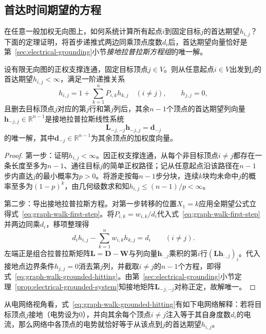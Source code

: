 \subsection{首达时间期望的方程}
\label{sec:graph-walk-hitting-equation}

在任意一般加权无向图上，如何系统计算所有起点$i$到固定目标$j$的首达期望$h_{i,j}$？下面的定理证明，将首步递推式两边同乘顶点度数$d_i$后，首达期望向量恰好是第~\ref{sec:electrical-grounding}小节\emph{接地拉普拉斯方程组}的唯一解。

\begin{theorem}[首达期望的接地拉普拉斯方程]
\label{prop:graph-walk-hitting-system}
设有限无向图的正权支撑连通，固定目标顶点$j\in V$。则从任意起点$i\in V$出发到$j$的首达期望$h_{i,j}<\infty$，满足一阶递推关系
\begin{equation}
h_{i,j}=1+\sum_{k=1}^n P_{i,k}h_{k,j}\quad(i\ne j),\qquad h_{j,j}=0,
\label{eq:graph-walk-first-step}
\end{equation}
且删去目标顶点$j$对应的第$j$行和第$j$列后，其余$n-1$个顶点的首达期望列向量$\bm h_{-j,j}\in\mathbb R^{n-1}$是接地拉普拉斯线性系统
\begin{equation}
\bm{L}_{-j,-j}\bm{h}_{-j,j}=\bm{d}_{-j}
\label{eq:graph-walk-grounded-hitting}
\end{equation}
的唯一解，其中$\bm d_{-j}\in\mathbb R^{n-1}$为其余顶点的加权度向量。
\end{theorem}

\begin{proof}
第一步：证明$h_{i,j}<\infty$。因正权支撑连通，从每个非目标顶点$i\neq j$都存在一条长度至多为$n-1$、通往目标$j$的简单正权路径；记从任意起点沿该路径在$n-1$步内直达$j$的最小概率为$p>0$。将游走按每$n-1$步分块，连续$k$块均未命中$j$的概率至多为$(1-p)^k$，由几何级数求和知$h_{i,j}\leq(n-1)/p<\infty$。

第二步：导出接地拉普拉斯方程。对第一步转移的位置$X_1=k$应用全期望公式立得式~\eqref{eq:graph-walk-first-step}。将$P_{i,k}=w_{i,k}/d_i$代入式~\eqref{eq:graph-walk-first-step}并两边同乘$d_i$，移项整理得
\[
d_i h_{i,j}-\sum_{k=1}^n w_{i,k}h_{k,j}=d_i\qquad(i\ne j).
\]
左端正是组合拉普拉斯矩阵$\bm L=\bm D-\bm W$与列向量$\bm h_{:,j}$乘积的第$i$行$(\bm L\bm h_{:,j})_i$。代入接地点边界条件$h_{j,j}=0$消去第$j$列，并截取$i\neq j$的$n-1$个方程，即得式~\eqref{eq:graph-walk-grounded-hitting}。由第~\ref{sec:electrical-grounding}小节定理~\ref{prop:electrical-grounded-system}知接地矩阵$\bm L_{-j,-j}$对称正定，故解唯一。
\end{proof}

从电网络视角看，式~\eqref{eq:graph-walk-grounded-hitting}有如下电网络解释：若将目标顶点$j$接地（电势设为$0$），并向其余每个顶点$i\neq j$注入等于其自身度数$d_i$的电流，那么网络中各顶点的电势就恰好等于从该点到$j$的首达期望$h_{i,j}$。

